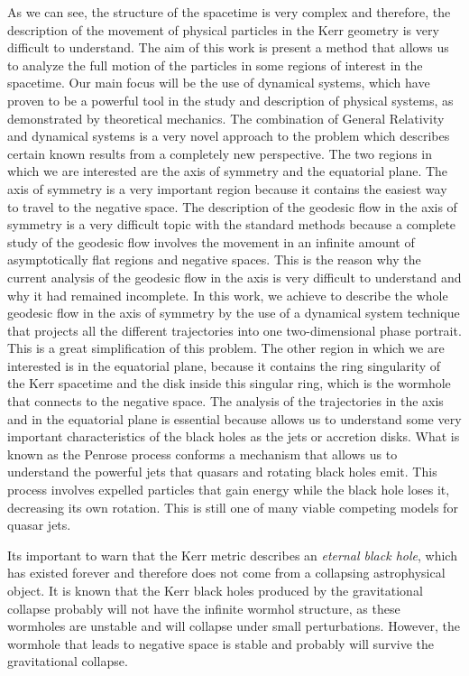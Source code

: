 As we can see, the structure of the spacetime is very complex and therefore, the description of the movement of physical particles in the Kerr geometry is very difficult to understand. The aim of this work is present a method that allows us to analyze the full motion of the particles in some regions of interest in the spacetime. Our main focus will be the use of dynamical systems, which have proven to be a powerful tool in the study and description of physical systems, as demonstrated by theoretical mechanics. The combination of General Relativity and dynamical systems is a very novel approach to the problem \cite{stoica1997schwarzschild,belbruno2011dynamical,galindo2014mcgehee} which describes certain known results from a completely new perspective. The two regions in which we are interested are the axis of symmetry and the equatorial plane. The axis of symmetry is a very important region because it contains the easiest way to travel to the negative space. The description of the geodesic flow in the axis of symmetry is a very difficult topic with the standard methods because a complete study of the geodesic flow involves the movement in an infinite amount of asymptotically flat regions and negative spaces. This is the reason why the current analysis of the geodesic flow in the axis is very difficult to understand and why it had remained incomplete. In this work, we achieve to describe the whole geodesic flow in the axis of symmetry by the use of a dynamical system technique that projects all the different trajectories into one two-dimensional phase portrait. This is a great simplification of this problem. The other region in which we are interested is in the equatorial plane, because it contains the ring singularity of the Kerr spacetime and the disk inside this singular ring, which is the wormhole that connects to the negative space. The analysis of the trajectories in the axis and in the equatorial plane is essential because allows us to understand some very important characteristics of the black holes as the jets or accretion disks. What is known as the Penrose process conforms a mechanism that allows us to understand the powerful jets that quasars and rotating black holes emit. This process involves expelled particles that gain energy while the black hole loses it, decreasing its own rotation. This is still one of many viable competing models for quasar jets.

Its important to warn that the Kerr metric describes an \textit{eternal black hole}, which has existed forever and therefore does not come from a collapsing astrophysical object. It is known that the Kerr black holes produced by the gravitational collapse probably will not have the infinite wormhol structure, as these wormholes are unstable and will collapse under small perturbations. However, the wormhole that leads to negative space is stable and probably will survive the gravitational collapse.

